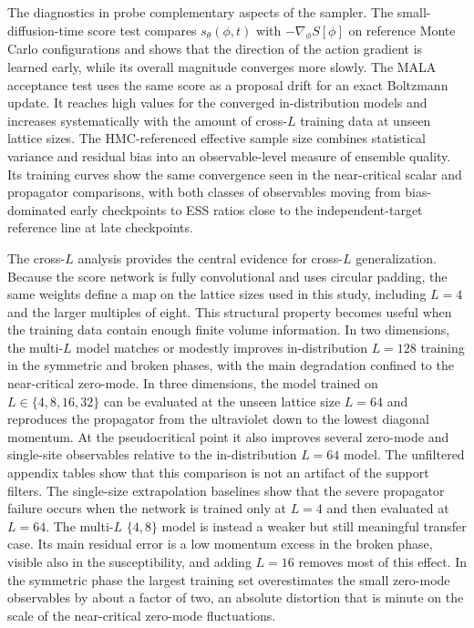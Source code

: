 \documentclass[reprint,twocolumn,superscriptaddress,preprintnumbers,amsmath,amssymb,aps,prd,floatfix]{revtex4-2}
\begin{document}
The diagnostics in  probe complementary aspects of the sampler. The small-diffusion-time score test compares $s_\theta(\phi,t)$ with $-\nabla_\phi S[\phi]$ on reference Monte Carlo configurations and shows that the direction of the action gradient is learned early, while its overall magnitude converges more slowly. The MALA acceptance test uses the same score as a proposal drift for an exact Boltzmann update. It reaches high values for the converged in-distribution models and increases systematically with the amount of cross-$L$ training data at unseen lattice sizes. The HMC-referenced effective sample size combines statistical variance and residual bias into an observable-level measure of ensemble quality. Its training curves show the same convergence seen in the near-critical scalar and propagator comparisons, with both classes of observables moving from bias-dominated early checkpoints to ESS ratios close to the independent-target reference line at late checkpoints.

The cross-$L$ analysis provides the central evidence for cross-$L$ generalization. Because the score network is fully convolutional and uses circular padding, the same weights define a map on the lattice sizes used in this study, including $L=4$ and the larger multiples of eight. This structural property becomes useful when the training data contain enough finite volume information. In two dimensions, the multi-$L$ model matches or modestly improves in-distribution $L=128$ training in the symmetric and broken phases, with the main degradation confined to the near-critical zero-mode. In three dimensions, the model trained on $L\in\{4,8,16,32\}$ can be evaluated at the unseen lattice size $L=64$ and reproduces the propagator from the ultraviolet down to the lowest diagonal momentum. At the pseudocritical point it also improves several zero-mode and single-site observables relative to the in-distribution $L=64$ model. The unfiltered appendix tables show that this comparison is not an artifact of the support filters. The single-size extrapolation baselines show that the severe propagator failure occurs when the network is trained only at $L=4$ and then evaluated at $L=64$. The multi-$L$ $\{4,8\}$ model is instead a weaker but still meaningful transfer case. Its main residual error is a low momentum excess in the broken phase, visible also in the susceptibility, and adding $L=16$ removes most of this effect. In the symmetric phase the largest training set overestimates the small zero-mode observables by about a factor of two, an absolute distortion that is minute on the scale of the near-critical zero-mode fluctuations.
\end{document}
